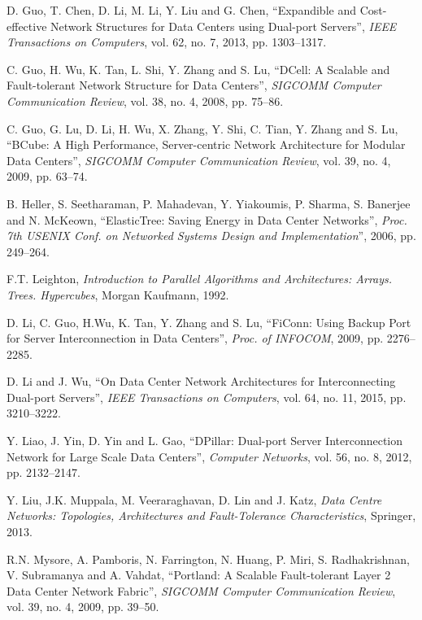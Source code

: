\documentclass{article}
\begin{document}
\begin{thebibliography}{99}
 D. Guo, T. Chen, D. Li, M. Li, Y. Liu and G. Chen, ``Expandible and Cost-effective Network Structures for Data Centers using Dual-port Servers'', \emph{IEEE Transactions on Computers}, vol. 62, no. 7, 2013, pp. 1303--1317.

 C. Guo, H. Wu, K. Tan, L. Shi, Y. Zhang and S. Lu, ``DCell: A Scalable and Fault-tolerant Network Structure for Data Centers'', \emph{SIGCOMM Computer Communication Review}, vol. 38, no. 4, 2008, pp. 75--86.

 C. Guo, G. Lu, D. Li, H. Wu, X. Zhang, Y. Shi, C. Tian, Y. Zhang and S. Lu, ``BCube: A High Performance, Server-centric Network Architecture for Modular Data Centers'', \emph{SIGCOMM Computer Communication Review}, vol. 39, no. 4, 2009, pp. 63--74.

 B. Heller, S. Seetharaman, P. Mahadevan, Y. Yiakoumis, P. Sharma, S. Banerjee and N. McKeown, ``ElasticTree: Saving Energy in Data Center Networks'', \emph{Proc. \emph{7\/}th USENIX Conf. on Networked Systems Design and Implementation\/}'', 2006, pp. 249--264.

 F.T. Leighton, \emph{Introduction to Parallel Algorithms and Architectures: Arrays. Trees. Hypercubes}, Morgan Kaufmann, 1992.

 D. Li, C. Guo, H.Wu, K. Tan, Y. Zhang and S. Lu, ``FiConn: Using Backup Port for Server Interconnection in Data Centers'', \emph{Proc. of INFOCOM}, 2009, pp. 2276--2285.

 D. Li and J. Wu, ``On Data Center Network Architectures for Interconnecting Dual-port Servers'', \emph{IEEE Transactions on Computers}, vol. 64, no. 11, 2015, pp. 3210--3222.

 Y. Liao, J. Yin, D. Yin and L. Gao, ``DPillar: Dual-port Server Interconnection Network for Large Scale Data Centers'', \emph{Computer Networks}, vol. 56, no. 8, 2012, pp. 2132--2147.



 Y. Liu, J.K. Muppala, M. Veeraraghavan, D. Lin and J. Katz, \emph{Data Centre Networks: Topologies, Architectures and Fault-Tolerance Characteristics}, Springer, 2013.

 R.N. Mysore, A. Pamboris, N. Farrington, N. Huang, P. Miri, S. Radhakrishnan, V. Subramanya and A. Vahdat, ``Portland: A Scalable Fault-tolerant Layer 2 Data Center Network Fabric'', \emph{SIGCOMM Computer Communication Review}, vol. 39, no. 4, 2009, pp. 39--50.


\end{thebibliography}
\end{document}

